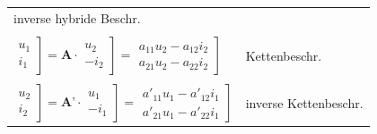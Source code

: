 \documentclass[a4paper,twocolumn,10pt]{article}
\begin{document}
\begin{tabular}{ll}
	inverse hybride Beschr.\\\\
	$\left.\begin{matrix}u_1\\i_1\end{matrix}\right] =\textbf{A}\cdot \left.\begin{matrix}u_2\\-i_2\end{matrix}\right]=\left.\begin{matrix}a_{11}u_2-a_{12}i_2\\a_{21}u_2-a_{22}i_2\end{matrix}\right]$ &
	Kettenbeschr.\\\\
	$\left.\begin{matrix}u_2\\i_2\end{matrix}\right] =\textbf{A'}\cdot \left.\begin{matrix}u_1\\-i_1\end{matrix}\right]=\left.\begin{matrix}a'_{11}u_1-a'_{12}i_1\\a'_{21}u_1-a'_{22}i_1\end{matrix}\right]$ &
	inverse Kettenbeschr.
\end{tabular}
\end{document}
